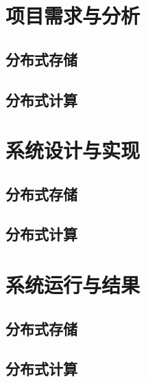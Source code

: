 \documentclass[12pt,a4paper]{article}
\begin{document}
\justifying
\setlength{\parindent}{2em}



\tableofcontents
\clearpage

\section{项目需求与分析}
\subsection{分布式存储}
\subsection{分布式计算}
\section{系统设计与实现}
\subsection{分布式存储}
\subsection{分布式计算}
\section{系统运行与结果}
\subsection{分布式存储}
\subsection{分布式计算}
\end{document}
